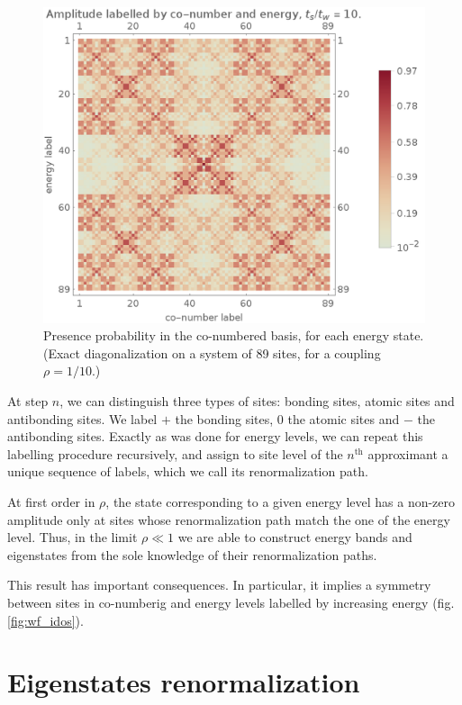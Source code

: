 \documentclass[11pt]{article}
\begin{document}
\begin{figure}[htp]
\centering
\includegraphics[scale=0.30]{wf_idos.png}
\caption{Presence probability in the co-numbered basis, for each energy state. (Exact diagonalization on a system of 89 sites, for a coupling $\rho = 1/10$.)}
\label{fig:wf_idos}
\end{figure}

At step $n$, we can distinguish three types of sites: bonding sites, atomic sites and antibonding sites.
We label $+$ the bonding sites, $0$ the atomic sites and $-$ the antibonding sites.
Exactly as was done for energy levels, we can repeat this labelling procedure recursively, and assign to site level of the $n^\text{th}$ approximant a unique sequence of labels, which we call its renormalization path.

At first order in $\rho$, the state corresponding to a given energy level has a non-zero amplitude only at sites whose renormalization path match the one of the energy level.
Thus, in the limit $\rho \ll 1$ we are able to construct energy bands and eigenstates from the sole knowledge of their renormalization paths. 

This result has important consequences. In particular, it implies a symmetry between sites in co-numberig and energy levels labelled by increasing energy (fig. \eqref{fig:wf_idos}).

\section{Eigenstates renormalization}
\end{document}

